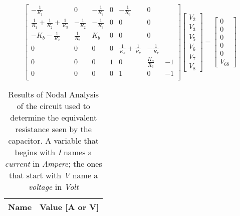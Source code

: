 \[
  \begin{bmatrix}
    -\frac{1}{R_1}                                & 0              & -\frac{1}{R_4} & 0 & -\frac{1}{R_6}                & 0                    \\
    \frac{1}{R_1} + \frac{1}{R_2} + \frac{1}{R_3} & -\frac{1}{R_2} & -\frac{1}{R_3} & 0 & 0                             & 0                    \\
    -K_b - \frac{1}{R_2}                          & \frac{1}{R_2}  & K_b            & 0 & 0                             & 0                    \\
    0                                             & 0              & 0              & 0 & \frac{1}{K_d} + \frac{1}{R_7} & -\frac{1}{R_7}       \\
    0                                             & 0              & 0              & 1 & 0                             & \frac{K_d}{R_6} & -1 \\
    0                                             & 0              & 0              & 0 & 1                             & 0               & -1 \\
  \end{bmatrix}
  \begin{bmatrix}
    V_2 \\ V_3 \\ V_5 \\ V_6 \\ V_7 \\ V_8
  \end{bmatrix}
  =
  \begin{bmatrix}
    0 \\ 0 \\ 0 \\ 0  \\ 0 \\ V_{68}
  \end{bmatrix}
\]

\hfill

\begin{table}[b]
  \centering
  \begin{tabular}{|l|r|}
    \hline
    {\bf Name} & {\bf Value [A or V]} \\ \hline
    
  \end{tabular}
  \caption{Results of Nodal Analysis of the circuit used to determine the equivalent resistance seen by the capacitor. A variable that begins  with \textit{I} names a \textit{current} in \textit{Ampere}; the ones that start with \textit{V} name a \textit{voltage} in \textit{Volt} }
  \label{tab:op_tabReq}
\end{table}


